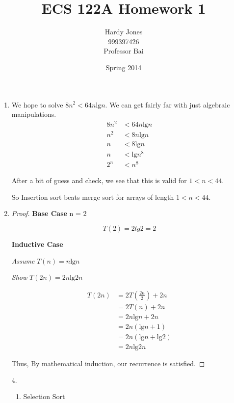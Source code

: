 \documentclass[12pt,letterpaper]{article}
\title{ECS 122A Homework 1\vspace{-2ex}}
\author{Hardy Jones\\
        999397426\\
        Professor Bai\vspace{-2ex}}
\date{Spring 2014}
\newcommand{\lb}[0]{\text{lg}}
\begin{document}
  \maketitle

  \begin{enumerate}
    \item
      We hope to solve $8n^2 < 64 n \lb  n$.
      We can get fairly far with just algebraic manipulations.
      \begin{align*}
        8n^2 &< 64n\lb n \\
        n^2 &< 8n\lb n \\
        n &< 8\lb n \\
        n &< \lb n^8 \\
        2^n &< n^8
      \end{align*}

      After a bit of guess and check, we see that this is valid for $1 < n < 44$.

      So Insertion sort beats merge sort for arrays of length $1 < n < 44$.

    \item
      \begin{proof}
        \textbf{Base Case} n = 2

        \[T(2) = 2 lg2 = 2\]

        \textbf{Inductive Case}

        \textit{Assume} $T(n) = n\lb n$

        \textit{Show} $T(2n) = 2n\lb 2n$

        \begin{align*}
          T(2n) &= 2T\left(\frac{2n}{2}\right) + 2n \\
          &= 2T(n) + 2n \\
          &= 2n\lb n + 2n \\
          &= 2n(\lb n + 1) \\
          &= 2n(\lb n + \lb 2) \\
          &= 2n\lb 2n
        \end{align*}

        Thus, By mathematical induction, our recurrence is satisfied.
      \end{proof}
    \item[4.]
      \begin{enumerate}
        \item
          \begin{algorithm}[H]
            Selection Sort
            \BlankLine


\end{algorithm}
\end{enumerate}
\end{enumerate}
\end{document}
